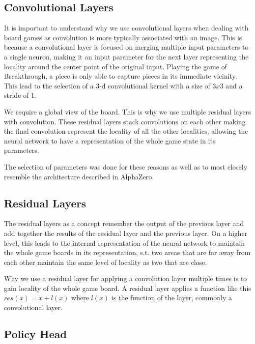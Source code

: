 \subsection{Convolutional Layers}

It is important to understand why we use convolutional layers when dealing with board games as convolution is more typically associated with an image. This is because a convolutional layer is focused on merging multiple input parameters to a single neuron, making it an input parameter for the next layer representing the locality around the center point of the original input. Playing the game of Breakthrough, a piece is only able to capture pieces in its immediate vicinity. This lead to the selection of a $3$-d convolutional kernel with a size of $3x3$ and a stride of $1$.

We require a global view of the board. This is why we use multiple residual layers with convolution. These residual layers stack convolutions on each other making the final convolution represent the locality of all the other localities, allowing the neural network to have a representation of the whole game state in its parameters.


The selection of parameters was done for these reasons as well as to most closely resemble the architecture described in AlphaZero.

\subsection{Residual Layers}

The residual layers as a concept remember the output of the previous layer and add together the results of the residual layer and the previous layer. On a higher level, this leads to the internal representation of the neural network to maintain the whole game boards in its representation, s.t. two areas that are far away from each other maintain the same level of locality as two that are close.

Why we use a residual layer for applying a convolution layer multiple times is to gain locality of the whole game board. A residual layer applies a function like this $res(x) = x + l(x)$ where $l(x)$ is the function of the layer, commonly a convolutional layer.

\subsection{Policy Head}

